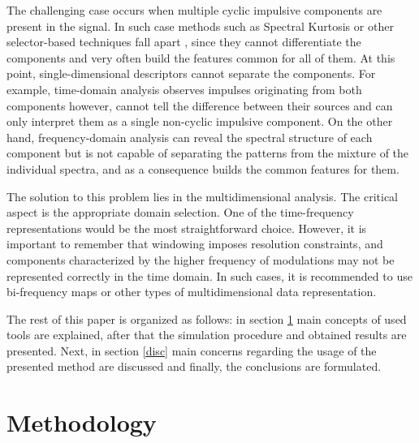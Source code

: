 \documentclass[3p,12pt]{elsarticle}
\begin{document}
The challenging case occurs when multiple cyclic impulsive components are present in the signal. In such case methods such as Spectral Kurtosis \cite{antoni2007cyclic,antoni2006spectral} or other selector-based techniques fall apart \cite{obuchowski2014selection,WYLOMANSKA201714,BARSZCZ2011431,protrugram_PK}, since they cannot differentiate the components and very often build the features common for all of them. At this point, single-dimensional descriptors cannot separate the components. For example, time-domain analysis observes impulses originating from both components however, cannot tell the difference between their sources and can only interpret them as a single non-cyclic impulsive component. On the other hand, frequency-domain analysis can reveal the spectral structure of each component but is not capable of separating the patterns from the mixture of the individual spectra, and as a consequence builds the common features for them.

The solution to this problem lies in the multidimensional analysis. The critical aspect is the appropriate domain selection. One of the time-frequency representations would be the most straightforward choice. However, it is important to remember that windowing imposes resolution constraints, and components characterized by the higher frequency of modulations may not be represented correctly in the time domain. In such cases, it is recommended to use bi-frequency maps or other types of multidimensional data representation.

The rest of this paper is organized as follows: in section \ref{meth} main concepts of used tools are explained, after that the simulation procedure and obtained results are presented. Next, in section \ref{disc} main concerns regarding the usage of the presented method are discussed and finally, the conclusions are formulated. 


\section{Methodology}\label{meth}
\end{document}
